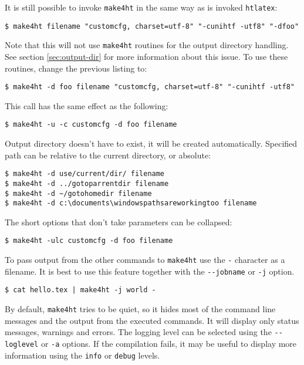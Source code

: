 It is still possible to invoke \texttt{make4ht} in the same way as is
invoked \texttt{htlatex}:

\begin{verbatim}
$ make4ht filename "customcfg, charset=utf-8" "-cunihtf -utf8" "-dfoo"
\end{verbatim}

Note that this will not use \texttt{make4ht} routines for the output
directory handling. See section \ref{sec:output-dir} for more
information about this issue. To use these routines, change the previous
listing to:

\begin{verbatim}
$ make4ht -d foo filename "customcfg, charset=utf-8" "-cunihtf -utf8"
\end{verbatim}

This call has the same effect as the following:

\begin{verbatim}
$ make4ht -u -c customcfg -d foo filename
\end{verbatim}

Output directory doesn't have to exist, it will be created
automatically. Specified path can be relative to the current directory,
or absolute:

\begin{verbatim}
$ make4ht -d use/current/dir/ filename
$ make4ht -d ../gotoparrentdir filename
$ make4ht -d ~/gotohomedir filename
$ make4ht -d c:\documents\windowspathsareworkingtoo filename
\end{verbatim}

The short options that don't take parameters can be collapsed:

\begin{verbatim}
$ make4ht -ulc customcfg -d foo filename
\end{verbatim}

To pass output from the other commands to \texttt{make4ht} use the
\texttt{-} character as a filename. It is best to use this feature
together with the \texttt{-\/-jobname} or \texttt{-j} option.

\begin{verbatim}
$ cat hello.tex | make4ht -j world -
\end{verbatim}

By default, \texttt{make4ht} tries to be quiet, so it hides most of the
command line messages and the output from the executed commands. It will
display only status messages, warnings and errors. The logging level can
be selected using the \texttt{-\/-loglevel} or \texttt{-a} options. If
the compilation fails, it may be useful to display more information
using the \texttt{info} or \texttt{debug} levels.

